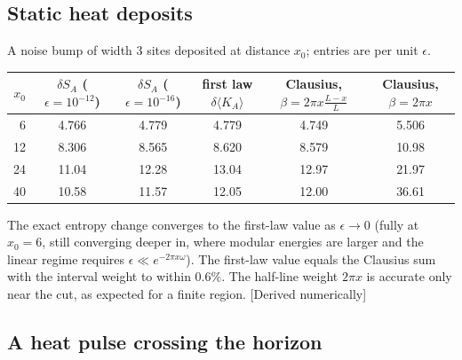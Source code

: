 \documentclass[11pt]{article}
\newcommand{\st}[1]{\textsf{\small[#1]}}
\begin{document}
\subsection{Static heat deposits}

A noise bump of width 3 sites deposited at distance $x_0$; entries are per unit $\epsilon$.
\begin{center}
\small\setlength{\tabcolsep}{4pt}\begin{tabular}{@{}rccccc@{}}
\toprule
$x_0$ & $\delta S_A$ ($\epsilon=10^{-12}$) & $\delta S_A$ ($\epsilon=10^{-16}$) & first law $\delta\langle K_A\rangle$ & Clausius, $\beta=2\pi x\frac{L-x}{L}$ & Clausius, $\beta=2\pi x$ \\
\midrule
6 & 4.766 & 4.779 & 4.779 & 4.749 & 5.506 \\
12 & 8.306 & 8.565 & 8.620 & 8.579 & 10.98 \\
24 & 11.04 & 12.28 & 13.04 & 12.97 & 21.97 \\
40 & 10.58 & 11.57 & 12.05 & 12.00 & 36.61 \\
\bottomrule
\end{tabular}
\end{center}
The exact entropy change converges to the first-law value as $\epsilon\to0$ (fully at $x_0=6$, still converging deeper in, where modular energies are larger and the linear regime requires $\epsilon\ll e^{-2\pi x\omega}$). The first-law value equals the Clausius sum with the interval weight to within $0.6\%$. The half-line weight $2\pi x$ is accurate only near the cut, as expected for a finite region. \st{Derived numerically}

\subsection{A heat pulse crossing the horizon}
\end{document}
